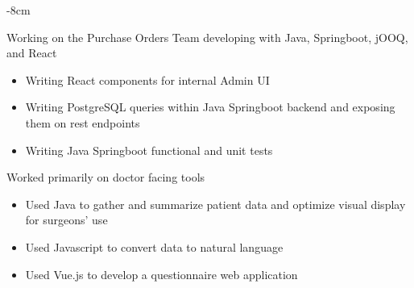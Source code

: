 \documentclass[10pt,letterpaper]{altacv}
\begin{document}
\photo{6cm}{}

\begin{adjustwidth}{}{-8cm}
\makecvheader
\end{adjustwidth}




{Working on the Purchase Orders Team developing with Java, Springboot, jOOQ, and React
\begin{itemize}
\item Writing React components for internal Admin UI
\item Writing PostgreSQL queries within Java Springboot backend and exposing them on rest endpoints
\item Writing Java Springboot functional and unit tests
\end{itemize}}

{Worked primarily on doctor facing tools
\begin{itemize}
\item Used Java to gather and summarize patient data and optimize visual display for surgeons’ use
\item Used Javascript to convert data to natural language
\item Used Vue.js to develop a questionnaire web application
\end{itemize}}
\end{document}

